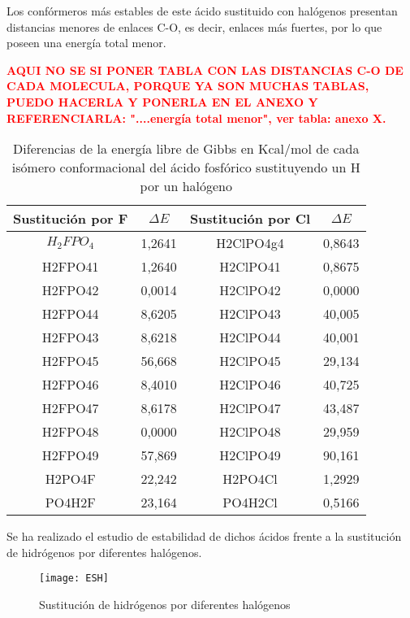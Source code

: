 Los confórmeros más estables de este ácido sustituido con halógenos presentan distancias menores de enlaces C-O, es decir, enlaces más fuertes, por lo que poseen una energía total menor.

\bfseries\textcolor{red} {AQUI NO SE SI PONER TABLA CON LAS DISTANCIAS C-O DE CADA MOLECULA, PORQUE YA SON MUCHAS TABLAS, PUEDO HACERLA Y PONERLA EN EL ANEXO Y REFERENCIARLA: "....energía total menor", ver tabla: anexo X.}
\begin{table}[H]
\begin{center}
\begin{tabular}{|c|c|c|c|}
\hline
Sustitución por F & $\Delta E$ & Sustitución por Cl & $\Delta E$ \\ \hline
$H_2FPO_4$& 1,2641 & H2ClPO4g4 & 0,8643 \\ \hline
H2FPO41 & 1,2640 & H2ClPO41 & 0,8675 \\ \hline
H2FPO42 & 0,0014 & H2ClPO42 & 0,0000 \\ \hline
H2FPO44	& 8,6205 & H2ClPO43 & 40,005 \\ \hline
H2FPO43	& 8,6218 & H2ClPO44 & 40,001 \\ \hline
H2FPO45	& 56,668 & H2ClPO45 & 29,134 \\ \hline
H2FPO46	& 8,4010 & H2ClPO46 & 40,725 \\ \hline
H2FPO47	& 8,6178 & H2ClPO47 & 43,487 \\ \hline
H2FPO48	& 0,0000 & H2ClPO48 & 29,959 \\ \hline
H2FPO49	& 57,869 & H2ClPO49 & 90,161 \\ \hline
H2PO4F & 22,242 & H2PO4Cl & 1,2929 \\ \hline
PO4H2F & 23,164 & PO4H2Cl & 0,5166 \\ \hline
\end{tabular}
\caption{Diferencias de la energía libre de Gibbs en Kcal/mol de cada isómero conformacional del ácido fosfórico sustituyendo un H por un halógeno}
\end{center}
\end{table}

Se ha realizado el estudio de estabilidad de dichos ácidos frente a la sustitución de hidrógenos por diferentes halógenos.
\begin{figure}[h]
	\centering
	\texttt{[image: ESH]}
	\caption{Sustitución de hidrógenos por diferentes halógenos}
\end{figure}

